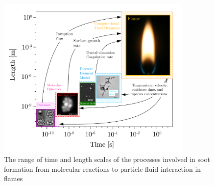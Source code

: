 \begin{figure}[!htbp]
	\centering
	\includegraphics[height=80mm, ]{Figures/Introduction/tlscales.jpg}
	\caption{The range of time and length scales of the processes involved in soot formation from molecular reactions to particle-fluid interaction in flames}
	\label{fig:sootscales}
\end{figure}





